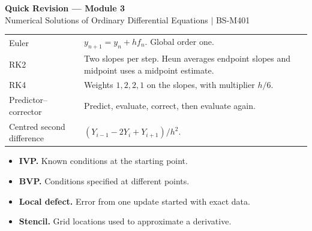 \documentclass[12pt,a4paper]{article}
\renewcommand{\arraystretch}{1.45}
\begin{document}
\newpage
\begin{center}
  {\large\bfseries\color{myred} Quick Revision --- Module 3}\\[3pt]
  {\small\color{mydark} Numerical Solutions of Ordinary Differential Equations $|$ BS-M401}
\end{center}
\noindent{\color{myred}\rule{\linewidth}{1.2pt}}\par\vspace{4pt}

\begin{tcolorbox}[formulabox, title={Key Concepts at a Glance}]
\renewcommand{\arraystretch}{1.35}
\noindent\begin{tabularx}{\linewidth}{B{4.5cm}Y}
Euler & $y_{n+1}=y_n+hf_n$. Global order one. \\[3pt]
RK2 & Two slopes per step. Heun averages endpoint slopes and midpoint uses a midpoint estimate. \\[3pt]
RK4 & Weights $1,2,2,1$ on the slopes, with multiplier $h/6$. \\[3pt]
Predictor--corrector & Predict, evaluate, correct, then evaluate again. \\[3pt]
Centred second difference & $(Y_{i-1}-2Y_i+Y_{i+1})/h^2$. \\[3pt]
\end{tabularx}\par
\end{tcolorbox}

\begin{tcolorbox}[defbox, title={One-Line Definitions}]
\begin{itemize}[leftmargin=*, itemsep=3pt, topsep=4pt]
  \item \textbf{IVP.} Known conditions at the starting point.
  \item \textbf{BVP.} Conditions specified at different points.
  \item \textbf{Local defect.} Error from one update started with exact data.
  \item \textbf{Stencil.} Grid locations used to approximate a derivative.
\end{itemize}
\end{tcolorbox}
\end{document}
